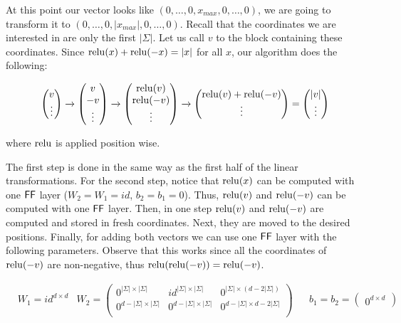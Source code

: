 \medskip

At this point our vector looks like $(0, \dots, 0, x_{max}, 0, \dots, 0)$, we are going to transform it to $(0, \dots, 0, |x_{max}|, 0, \dots, 0)$.
Recall that the coordinates we are interested in are only the first $|\Sigma|$.
Let us call $v$ to the block containing these coordinates.
Since $\mathrm{relu}(x) + \mathrm{relu}(-x) = |x|$ for all $x$, our algorithm does the following:

\[
    \left(\begin{matrix}  v \\ \vdots \end{matrix}\right)
    \xrightarrow[]{}
    \left(\begin{matrix}  v \\ -v \\\vdots \end{matrix}\right)
    \xrightarrow[]{}
    \left(\begin{matrix}  \mathrm{relu}(v) \\ \mathrm{relu}(-v) \\\vdots \end{matrix}\right)
    \xrightarrow[]{}
    \left(\begin{matrix}  \mathrm{relu}(v) + \mathrm{relu}(-v) \\ \vdots \end{matrix}\right)
    = \left(\begin{matrix}  |v| \\ \vdots \end{matrix}\right)
\]

\noindent where $\mathrm{relu}$ is applied position wise. 


The first step is done in the same way as the first half of the linear transformations.
For the second step, notice that $\mathrm{relu}(x)$ can be computed with one $\mathsf{FF}$ layer ($W_2 = W_1 = id$, $b_2 = b_1 = 0$).
Thus, $\mathrm{relu}(v)$ and $\mathrm{relu}(-v)$ can be computed with one $\mathsf{FF}$ layer.
Then, in one step $\mathrm{relu}(v)$ and $\mathrm{relu}(-v)$ are computed and stored in fresh coordinates.
Next, they are moved to the desired positions.
Finally, for adding both vectors we can use one $\mathsf{FF}$ layer with the following parameters.
Observe that this works since all the coordinates of $\mathrm{relu}(-v)$ are non-negative, thus $\mathrm{relu}(\mathrm{relu}(-v)) = \mathrm{relu}(-v)$.


\begin{align*}
    & W_1 = id^{d\times d}
    & W_2  = \left(\begin{matrix}
        0^{|\Sigma| \times |\Sigma|}    & id^{|\Sigma| \times |\Sigma|}   & 0^{|\Sigma| \times (d - 2|\Sigma|)}\\
        0^{d-|\Sigma| \times |\Sigma|}  & 0^{d-|\Sigma| \times |\Sigma|}  & 0^{d-|\Sigma| \times d-2|\Sigma|} \\
    \end{matrix}\right) &
    & b_1 = b_2 = \left(\begin{matrix}
        0^{d\times d}
    \end{matrix}\right) 
\end{align*}
